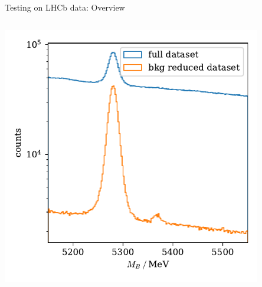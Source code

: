\documentclass[aspectratio=1610, 10pt]{beamer}
\begin{document}
\begin{frame}{Testing on LHCb data: Overview}
\begin{columns}[t]
\begin{column}{0.5\textwidth}
{{        \includegraphics[width=0.85\textwidth]{images/BKG_reduced.pdf}
      }}
    \end{column}
  \end{columns}  
\end{frame}
\end{document}
